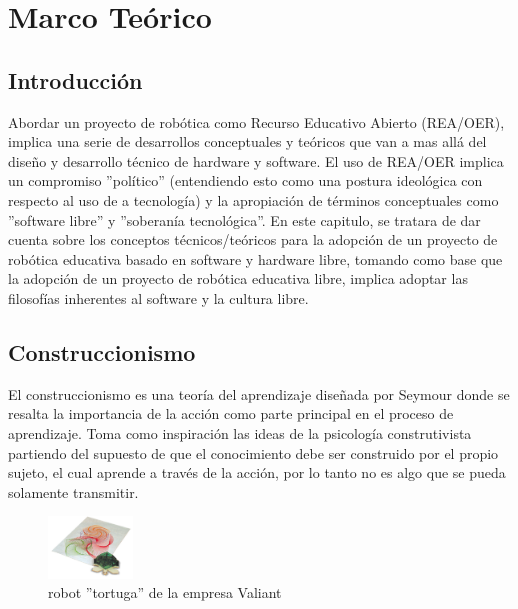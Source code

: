 
\chapter{Marco Teórico}

\section{Introducción}

Abordar un proyecto de robótica como Recurso Educativo Abierto (REA/OER), implica una serie de desarrollos conceptuales y teóricos que van a mas allá del diseño y desarrollo técnico de hardware y software. El uso de REA/OER \citep{montoya2012recursos} implica un compromiso ''político'' (entendiendo esto como una postura ideológica con respecto al uso de a tecnología) y la apropiación de términos conceptuales como ''software libre'' y ''soberanía tecnológica''. En este capitulo, se tratara de dar cuenta sobre los conceptos técnicos/teóricos para  la adopción de un proyecto de robótica educativa basado en software y hardware libre, tomando como base que la adopción de un proyecto de robótica educativa libre, implica adoptar las filosofías inherentes al software y la cultura libre.

\section{Construccionismo}

El construccionismo es una teoría del aprendizaje diseñada por Seymour \cite{seymour_papert_desafio_1987} donde se resalta la importancia de la acción como parte principal en el proceso de aprendizaje. Toma como inspiración las ideas de la psicología construtivista partiendo del supuesto de que el conocimiento debe ser construido por el propio sujeto, el cual aprende a través de la acción, por lo tanto no es algo que se pueda solamente transmitir.

\begin{figure}
  \begin{center}
    \includegraphics[width=0.2\textwidth]{figuras/Turtle_draw.jpg}
    \caption[Caption for LOF]{robot ''tortuga'' de la empresa Valiant}
    
    \label{fig:turtle }
  \end{center}
\end{figure}

